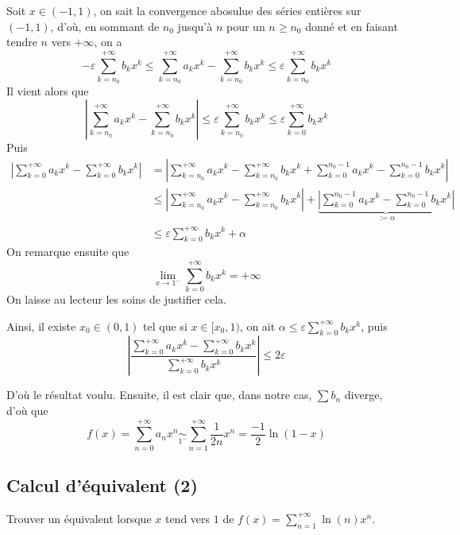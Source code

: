\begin{correction}
\begin{enumerate}
		Soit $x\in(-1,1)$, on sait la convergence abosulue des séries entières sur $(-1,1)$, d'où, en sommant de $n_0$ jusqu'à $n$ pour un $n\geq n_0$ donné et en faisant tendre $n$ vers $+\infty$, on a 
		\[-\varepsilon\sum_{k=n_0}^{+\infty}b_kx^k\leq \sum_{k=n_0}^{+\infty}a_kx^k-\sum_{k=n_0}^{+\infty}b_kx^k\leq\varepsilon\sum_{k=n_0}^{+\infty}b_kx^k\]
		Il vient alors que \[\left |\sum_{k=n_0}^{+\infty}a_kx^k-\sum_{k=n_0}^{+\infty}b_kx^k \right|\leq \varepsilon\sum_{k=n_0}^{+\infty}b_kx^k\leq\varepsilon\sum_{k=0}^{+\infty}b_kx^k\]
		Puis 
		\begin{align*}
			\left |\sum_{k=0}^{+\infty}a_kx^k-\sum_{k=0}^{+\infty}b_kx^k \right| & =  \left |\sum_{k=n_0}^{+\infty}a_kx^k-\sum_{k=n_0}^{+\infty}b_kx^k + \sum_{k=0}^{n_0-1}a_kx^k-\sum_{k=0}^{n_0-1}b_kx^k\right|\\
																					 & \leq \left |\sum_{k=n_0}^{+\infty}a_kx^k-\sum_{k=n_0}^{+\infty}b_kx^k \right| + \underbrace{\left|\sum_{k=0}^{n_0-1}a_kx^k-\sum_{k=0}^{n_0-1}b_kx^k\right|}_{:=\alpha}\\
																					 & \leq \varepsilon\sum_{k=0}^{+\infty}b_kx^k + \alpha
		\end{align*}
		On remarque ensuite que \[\lim_{x\to1^-}\sum_{k=0}^{+\infty}b_kx^k=+\infty\]
		On laisse au lecteur les soins de justifier cela.


		Ainsi, il existe $x_0\in(0, 1)$ tel que si $x\in[x_0,1)$, on ait $\alpha \leq \varepsilon\displaystyle\sum_{k=0}^{+\infty}b_kx^k$, puis \[\left |\frac{\displaystyle\sum_{k=0}^{+\infty}a_kx^k-\displaystyle\sum_{k=0}^{+\infty}b_kx^k}{\displaystyle\sum_{k=0}^{+\infty}b_kx^k}\right|\leq 2\varepsilon\]



		D'où le résultat voulu. Ensuite, il est clair que, dans notre cas, $\displaystyle\sum b_n$ diverge, d'où que \[\boxed{f(x)=\sum_{n=0}^{+\infty}a_nx^n\underset{1^-}{\sim}\sum_{n=1}^{+\infty}\frac1{2n}x^n=\frac{-1}2\ln(1-x)}\]
	\end{enumerate}
\end{correction}

\subsection{Calcul d'équivalent (2)}
\begin{exercice}
	Trouver un équivalent lorsque $x$ tend vers $1$ de $f(x)=\displaystyle\sum_{n=1}^{+\infty}\ln(n)x^n$.
\end{exercice}


